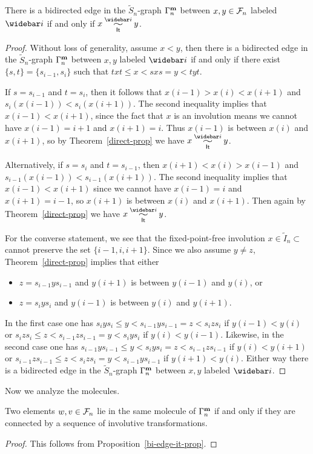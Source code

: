 \documentclass[11pt]{article}
\begin{document}
\begin{proposition}\label{bi-edge-it-prop}
There is a bidirected edge in the $\tilde S_n$-graph $\Gamma^{\mathbf{m}}_n$ between $x,y\in\mathcal F_n$ labeled $\widebar i$ if and only if $x\simRBS{\widebar i} y$.
\end{proposition}
\begin{proof}
Without loss of generality, assume $x<y$, then there is a bidirected edge in the $\tilde S_n$-graph $\Gamma^{\mathbf{m}}_n$ between $x,y$ labeled $\widebar i$ if and only if there exist $\{s,t\}=\{s_{i-1},s_i\}$ such that $txt\le x<sxs=y<tyt$.

If $s=s_{i-1}$ and $t=s_i$, then it follows that $x(i-1)>x(i)<x(i+1)$ and $s_i(x(i-1))<s_i(x(i+1))$. 
The second inequality implies that $x(i-1) <x(i+1)$, since 
the fact that $x$ is an involution means we cannot have $x(i-1)=i+1$ and $x(i+1)=i$. 
Thus $x(i-1)$ is between $x(i)$ and $x(i+1)$, so by Theorem~\ref{direct-prop} we have $x\simRBS{\widebar i}y$.

Alternatively, if $s=s_i$ and $t=s_{i-1}$, then  $x(i+1)<x(i)>x(i-1)$ and $s_{i-1}(x(i-1))<s_{i-1}(x(i+1))$. 
The second inequality implies that $x(i-1) <x(i+1)$ since we cannot have $x(i-1)=i$ and $x(i+1)=i-1$,
so $x(i+1)$ is between $x(i)$ and $x(i+1)$. Then again by Theorem~\ref{direct-prop} we have $x\simRBS{\widebar i}y$.

For the converse statement, we see that the fixed-point-free involution $x\in\tilde{I}_n\subset$ cannot preserve the set $ \{i-1,i,i+1\}$.
Since we also assume $y\neq z$, Theorem~\ref{direct-prop} implies that either
\begin{itemize}
\item  $z=s_{i-1}ys_{i-1}$ and $y(i+1)$ is between $y(i-1)$ and $y(i)$, or
 \item $z=s_{i}ys_{i}$ and  $y(i-1)$ is between $y(i)$ and $y(i+1)$.
 \end{itemize} 
In the first case one has $s_iys_i \leq y < s_{i-1}ys_{i-1} = z <s_izs_i$ if $y(i-1) < y(i)$ or
$s_izs_i \leq z < s_{i-1}zs_{i-1} = y <s_iys_i$ if $y(i) < y(i-1)$.
Likewise,
in the second case one has $s_{i-1}ys_{i-1}\leq y < s_iys_i = z<s_{i-1}zs_{i-1}$ if $y(i) < y(i+1)$
or $s_{i-1}zs_{i-1}\leq z < s_izs_i = y<s_{i-1}ys_{i-1}$ if  $y(i+1) < y(i)$.
Either way there is a bidirected edge in the $\tilde S_n$-graph $\Gamma^{\mathbf{m}}_n$ between $x,y$ labeled $\widebar i$.
\end{proof}

Now we analyze the molecules.
\begin{theorem}\label{mol-m-thm}
Two elements $w,v\in\mathcal F_n$ lie in the same molecule of $\Gamma^{\mathbf{m}}_n$ if and only if they are connected by a sequence of involutive transformations.
\end{theorem}
\begin{proof}
This follows from Proposition~\ref{bi-edge-it-prop}.
\end{proof}
\end{document}
